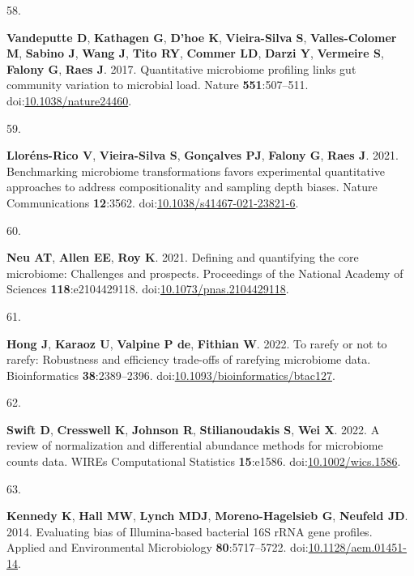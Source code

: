 \documentclass[
]{article}
\newlength{\cslhangindent}
\newlength{\csllabelwidth}
\newlength{\cslentryspacingunit} %
\newenvironment{CSLReferences}[2] %
 {%
  \setlength{\parindent}{0pt}
  \ifodd #1
  \let\oldpar\par
  \def\par{\hangindent=\cslhangindent\oldpar}
  \fi
  \setlength{\parskip}{#2\cslentryspacingunit}
 }%
 {}
\newcommand{\CSLLeftMargin}[1]{\parbox[t]{\csllabelwidth}{#1}}
\newcommand{\CSLRightInline}[1]{\parbox[t]{\linewidth - \csllabelwidth}{#1}\break}
\begin{document}
\begin{CSLReferences}{0}{1}
\leavevmode{}%
\CSLLeftMargin{58. }%
\CSLRightInline{\textbf{Vandeputte D}, \textbf{Kathagen G},
\textbf{D'hoe K}, \textbf{Vieira-Silva S}, \textbf{Valles-Colomer M},
\textbf{Sabino J}, \textbf{Wang J}, \textbf{Tito RY}, \textbf{Commer
LD}, \textbf{Darzi Y}, \textbf{Vermeire S}, \textbf{Falony G},
\textbf{Raes J}. 2017. Quantitative microbiome profiling links gut
community variation to microbial load. Nature \textbf{551}:507--511.
doi:\href{https://doi.org/10.1038/nature24460}{10.1038/nature24460}.}

\leavevmode{}%
\CSLLeftMargin{59. }%
\CSLRightInline{\textbf{Lloréns-Rico V}, \textbf{Vieira-Silva S},
\textbf{Gonçalves PJ}, \textbf{Falony G}, \textbf{Raes J}. 2021.
Benchmarking microbiome transformations favors experimental quantitative
approaches to address compositionality and sampling depth biases. Nature
Communications \textbf{12}:3562.
doi:\href{https://doi.org/10.1038/s41467-021-23821-6}{10.1038/s41467-021-23821-6}.}

\leavevmode{}%
\CSLLeftMargin{60. }%
\CSLRightInline{\textbf{Neu AT}, \textbf{Allen EE}, \textbf{Roy K}.
2021. Defining and quantifying the core microbiome: Challenges and
prospects. Proceedings of the National Academy of Sciences
\textbf{118}:e2104429118.
doi:\href{https://doi.org/10.1073/pnas.2104429118}{10.1073/pnas.2104429118}.}

\leavevmode{}%
\CSLLeftMargin{61. }%
\CSLRightInline{\textbf{Hong J}, \textbf{Karaoz U}, \textbf{Valpine P
de}, \textbf{Fithian W}. 2022. To rarefy or not to rarefy: Robustness
and efficiency trade-offs of rarefying microbiome data. Bioinformatics
\textbf{38}:2389--2396.
doi:\href{https://doi.org/10.1093/bioinformatics/btac127}{10.1093/bioinformatics/btac127}.}

\leavevmode{}%
\CSLLeftMargin{62. }%
\CSLRightInline{\textbf{Swift D}, \textbf{Cresswell K}, \textbf{Johnson
R}, \textbf{Stilianoudakis S}, \textbf{Wei X}. 2022. A review of
normalization and differential abundance methods for microbiome counts
data. {WIREs} Computational Statistics \textbf{15}:e1586.
doi:\href{https://doi.org/10.1002/wics.1586}{10.1002/wics.1586}.}

\leavevmode{}%
\CSLLeftMargin{63. }%
\CSLRightInline{\textbf{Kennedy K}, \textbf{Hall MW}, \textbf{Lynch
MDJ}, \textbf{Moreno-Hagelsieb G}, \textbf{Neufeld JD}. 2014. Evaluating
bias of {I}llumina-based bacterial 16S {rRNA} gene profiles. Applied and
Environmental Microbiology \textbf{80}:5717--5722.
doi:\href{https://doi.org/10.1128/aem.01451-14}{10.1128/aem.01451-14}.}


\end{CSLReferences}
\end{document}
